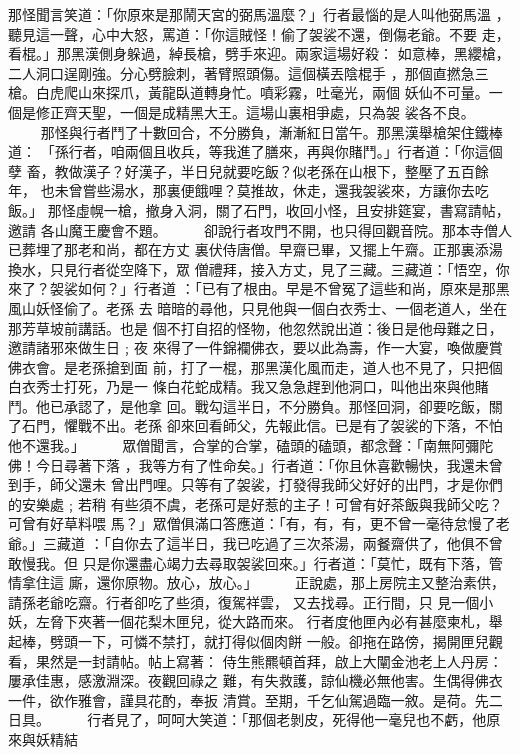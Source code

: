 \begin{pinyinscope}
{那怪聞言笑道：「你原來是那鬧天宮的弼馬溫麼？」行者最惱的是人叫他弼馬溫
，聽見這一聲，心中大怒，罵道：「你這賊怪！偷了袈裟不還，倒傷老爺。不要
走，看棍。」那黑漢側身躲過，綽長槍，劈手來迎。兩家這場好殺：
如意棒，黑纓槍，二人洞口逞剛強。分心劈臉刺，著臂照頭傷。這個橫丟陰棍手
，那個直撚急三槍。白虎爬山來探爪，黃龍臥道轉身忙。噴彩霧，吐毫光，兩個
妖仙不可量。一個是修正齊天聖，一個是成精黑大王。這場山裏相爭處，只為袈
裟各不良。
　　
那怪與行者鬥了十數回合，不分勝負，漸漸紅日當午。那黑漢舉槍架住鐵棒道：
「孫行者，咱兩個且收兵，等我進了膳來，再與你賭鬥。」行者道：「你這個孽
畜，教做漢子？好漢子，半日兒就要吃飯？似老孫在山根下，整壓了五百餘年，
也未曾嘗些湯水，那裏便餓哩？莫推故，休走，還我袈裟來，方讓你去吃飯。」
那怪虛幌一槍，撤身入洞，關了石門，收回小怪，且安排筵宴，書寫請帖，邀請
各山魔王慶會不題。
　　
卻說行者攻門不開，也只得回觀音院。那本寺僧人已葬埋了那老和尚，都在方丈
裏伏侍唐僧。早齋已畢，又擺上午齋。正那裏添湯換水，只見行者從空降下，眾
僧禮拜，接入方丈，見了三藏。三藏道：「悟空，你來了？袈裟如何？」行者道
：「已有了根由。早是不曾冤了這些和尚，原來是那黑風山妖怪偷了。老孫 去
暗暗的尋他，只見他與一個白衣秀士、一個老道人，坐在那芳草坡前講話。也是
個不打自招的怪物，他忽然說出道：後日是他母難之日，邀請諸邪來做生日﹔夜
來得了一件錦襴佛衣，要以此為壽，作一大宴，喚做慶賞佛衣會。是老孫搶到面
前，打了一棍，那黑漢化風而走，道人也不見了，只把個白衣秀士打死，乃是一
條白花蛇成精。我又急急趕到他洞口，叫他出來與他賭鬥。他已承認了，是他拿
回。戰勾這半日，不分勝負。那怪回洞，卻要吃飯，關了石門，懼戰不出。老孫
卻來回看師父，先報此信。已是有了袈裟的下落，不怕他不還我。」
　　
眾僧聞言，合掌的合掌，磕頭的磕頭，都念聲：「南無阿彌陀佛！今日尋著下落
，我等方有了性命矣。」行者道：「你且休喜歡暢快，我還未曾到手，師父還未
曾出門哩。只等有了袈裟，打發得我師父好好的出門，才是你們的安樂處﹔若稍
有些須不虞，老孫可是好惹的主子！可曾有好茶飯與我師父吃？可曾有好草料喂
馬？」眾僧俱滿口答應道：「有，有，有，更不曾一毫待怠慢了老爺。」三藏道
：「自你去了這半日，我已吃過了三次茶湯，兩餐齋供了，他俱不曾敢慢我。但
只是你還盡心竭力去尋取袈裟回來。」行者道：「莫忙，既有下落，管情拿住這
廝，還你原物。放心，放心。」
　　
正說處，那上房院主又整治素供，請孫老爺吃齋。行者卻吃了些須，復駕祥雲，
又去找尋。正行間，只 見一個小妖，左脅下夾著一個花梨木匣兒，從大路而來。
行者度他匣內必有甚麼柬札，舉起棒，劈頭一下，可憐不禁打，就打得似個肉餅
一般。卻拖在路傍，揭開匣兒觀看，果然是一封請帖。帖上寫著：
侍生熊羆頓首拜，啟上大闡金池老上人丹房：屢承佳惠，感激淵深。夜觀回祿之
難，有失救護，諒仙機必無他害。生偶得佛衣一件，欲作雅會，謹具花酌，奉扳
清賞。至期，千乞仙駕過臨一敘。是荷。先二日具。
　　
行者見了，呵呵大笑道：「那個老剝皮，死得他一毫兒也不虧，他原來與妖精結
}
\end{pinyinscope}
